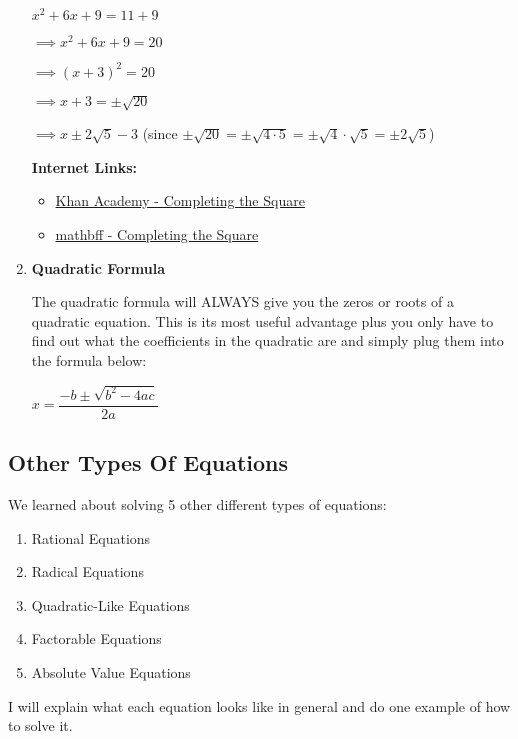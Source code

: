 \documentclass[12pt]{article}
\newenvironment{myindentpar}[1]%
     {\begin{list}{}%
             {\setlength{\leftmargin}{#1}}%
             \item[]%
     }
     {\end{list}}
\begin{document}
\begin{myindentpar}{1cm}
\begin{enumerate}
\centerline{$x^2 + 6x + 9 = 11 + 9$}

$\implies x^2 + 6x + 9 = 20$

$\implies (x+3)^2 = 20$

$\implies x+3 = \pm \sqrt{20}$

$\implies x \pm 2\sqrt{5} - 3$ \hspace{1cm} (since $\pm \sqrt{20} = \pm \sqrt{4 \cdot 5} = \pm \sqrt{4} \cdot \sqrt{5} = \pm 2 \sqrt{5}$)

\textbf{Internet Links:}

\begin{itemize}
\item \href{https://www.khanacademy.org/math/algebra/quadratics/completing_the_square/v/solving-quadratic-equations-by-completing-the-square}{Khan Academy - Completing the Square} 

\item \href{https://www.youtube.com/watch?v=bclm1tJB-3g}{mathbff - Completing the Square}

\end{itemize}

\item \textbf{Quadratic Formula}

The quadratic formula will ALWAYS give you the zeros or roots of a quadratic equation. This is its most useful advantage plus you only have to find out what the coefficients in the quadratic are and simply plug them into the formula below:
\newline

\centerline{$x = \dfrac{-b \pm \sqrt{b^{2} - 4ac}}{2a}$}
\end{enumerate}



\end{myindentpar}

\subsection{Other Types Of Equations}

We learned about solving 5 other different types of equations:

\begin{enumerate}
\item Rational Equations

\item Radical Equations

\item Quadratic-Like Equations

\item Factorable Equations

\item Absolute Value Equations

\end{enumerate}
I will explain what each equation looks like in general and do one example of how to solve it.
\end{document}
